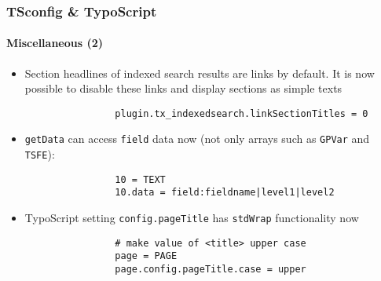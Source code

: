 \begin{frame}[fragile]
	\frametitle{TSconfig \& TypoScript}
	\framesubtitle{Miscellaneous (2)}

	\begin{itemize}

		\item Section headlines of indexed search results are links by default.
			It is now possible to disable these links and display sections as simple texts

			\begin{lstlisting}
				plugin.tx_indexedsearch.linkSectionTitles = 0
			\end{lstlisting}

		\item \texttt{getData} can access \texttt{field} data now (not only arrays
			such as \texttt{GPVar} and \texttt{TSFE}):
		
			\begin{lstlisting}
				10 = TEXT
				10.data = field:fieldname|level1|level2
			\end{lstlisting}

		\item TypoScript setting \texttt{config.pageTitle} has \texttt{stdWrap} functionality now

			\begin{lstlisting}
				# make value of <title> upper case
				page = PAGE
				page.config.pageTitle.case = upper
			\end{lstlisting}

	\end{itemize}

\end{frame}


